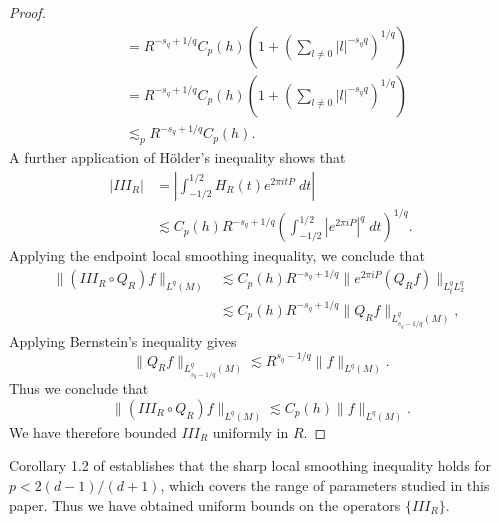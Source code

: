 \documentclass[dvipsnames,letterpaper,12pt]{article}
\begin{document}
\begin{proof}
\begin{align*}
        &= R^{-s_q + 1/q} C_p(h) \left( 1 + \left( \sum_{l \neq 0} |l|^{-s_q q} \right)^{1/q} \right)\\
        &= R^{-s_q + 1/q} C_p(h) \left( 1 + \left( \sum_{l \neq 0} |l|^{- s_q q} \right)^{1/q} \right) \\
        &\lesssim_p R^{-s_q + 1/q} C_p(h).
    \end{align*}
    A further application of H\"{o}lder's inequality shows that
    \begin{align*}
        | III_R | &= \left| \int_{-1/2}^{1/2} H_R(t) e^{2 \pi i t P}\; dt \right|\\
        &\lesssim C_p(h) R^{-s_q + 1/q} \left( \int_{-1/2}^{1/2} |e^{2 \pi i P}|^{q}\; dt \right)^{1/q}.
    \end{align*}
    Applying the endpoint local smoothing inequality, we conclude that
    \begin{align*}
        \| (III_R \circ Q_R)f \|_{L^{q}(M)} &\lesssim C_p(h) R^{-s_q + 1/q} \| e^{2 \pi i P} (Q_R f) \|_{L^{q}_t L^{q}_x}\\
        &\lesssim C_p(h) R^{-s_q + 1/q} \| Q_R f \|_{L^{q}_{s_q - 1/q}(M)},
    \end{align*}
    Applying Bernstein's inequality gives
    \[ \| Q_R f \|_{L^{q}_{s_q - 1/q}(M)} \lesssim R^{s_q - 1/q} \| f \|_{L^q(M)}. \]
    Thus we conclude that
    \[ \| (III_R \circ Q_R) f \|_{L^{q}(M)} \lesssim C_p(h) \| f \|_{L^{q}(M)}. \]
    We have therefore bounded $III_R$ uniformly in $R$.
\end{proof}

Corollary 1.2 of \cite{LeeSeeger} establishes that the sharp local smoothing inequality holds for $p < 2(d-1)/(d+1)$, which covers the range of parameters studied in this paper. Thus we have obtained uniform bounds on the operators $\{ III_R \}$.
\end{document}
